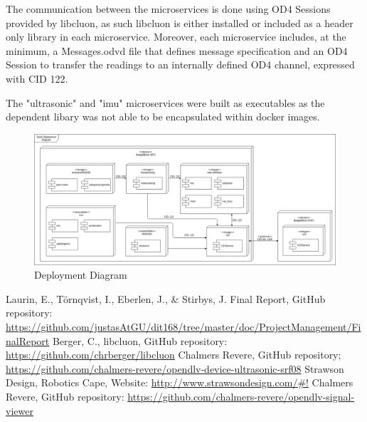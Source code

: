 \documentclass[12pt]{article}
\begin{document}
The communication between the microservices is done using OD4 Sessions provided by libcluon\cite{libcluon}, as such libcluon is either installed or included as a header only library in each microservice. Moreover, each microservice includes, at the minimum, a Messages.odvd file that defines message specification and an OD4 Session to transfer the readings to an internally defined OD4 channel, expressed with CID 122. \par

The "ultrasonic" and "imu" microservices were built as executables as the dependent libary \cite{robotics cape} was not able to be encapsulated within docker images.

\FloatBarrier %
\begin{figure}[ht!]
\centering
\includegraphics[width=\linewidth]{Diagrams/DeploymentDiagram.png}
\caption{Deployment Diagram}
\label{fig:deploymentdiagram}
\end{figure}
\FloatBarrier %

\pagebreak

\begin{thebibliography}{9}
	 Laurin, E., Törnqvist, I., Eberlen, J., \& Stirbys, J. Final Report, GitHub repository:
\url{https://github.com/justasAtGU/dit168/tree/master/doc/ProjectManagement/FinalReport}
	 Berger, C., libcluon, GitHub repository: \url{https://github.com/chrberger/libcluon}
	 Chalmers Revere, GitHub repository; \url{https://github.com/chalmers-revere/opendlv-device-ultrasonic-srf08}
     Strawson Design, Robotics Cape, Website: \url{http://www.strawsondesign.com/\#!}
	 Chalmers Revere, GitHub repository: \url{https://github.com/chalmers-revere/opendlv-signal-viewer}
\end{thebibliography}
\end{document}
